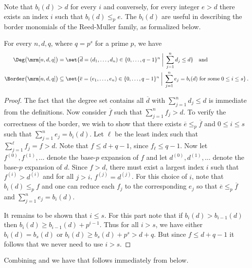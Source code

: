 Note that $b_i(d) > d$ for every $i$ and
conversely, for every integer $e > d$ there exists an index $i$ such
that $b_i(d) \leq_p e$.
%
The $b_i(d)$      %
are useful in describing
the border monomials of the Reed-Muller family, as formalized below.

\begin{proposition}
\label{prop:rmborder}
For every $n,d,q$, where $q=p^s$ for a prime $p$, we have
\begin{align*}
  \Deg\big(\mrm[n,d,q]\big) & =  \set{\overline d=(d_1,\ldots,d_n) \in \{0,\ldots,q-1\}^n \; \bigg| \; \sum_{j=1}^n d_j \leq d
} \quad\text{and}\\
\Border\big(\mrm[n,d,q]\big) & \subseteq 
\set{\overline e=(e_1,\ldots,e_n) \in \{0,\ldots,q-1\}^n \; \bigg| \;  \sum_{j=1}^n e_j = b_i(d) \; \text{for some} \; 0 \leq i \leq s   }\,.
\end{align*}
\end{proposition}

\begin{proof}
The fact that the degree set contains all ${\overline d}$
with $\sum_{j=1}^n d_j \leq d$ is immediate from the definitions.
Now consider ${\overline f}$ such that $\sum_{j=1}^n f_j > d$.
To verify the correctness of the border,
we wish to show that there exists ${\overline e} \leq_p
{\overline f}$ and $0 \leq i \leq s$ such that $\sum_{j=1}^n e_j =
b_i(d)$. Let $\ell$ be the least index such that $\sum_{j=1}^\ell
f_j = f > d$. Note that $f \leq d + q - 1$, since $f_\ell \leq
q - 1$. Now let $f^{(0)},f^{(1)},\ldots$ denote the
base-$p$ expansion of $f$ and let
$d^{(0)},d^{(1)},\ldots$ denote the base-$p$ expansion of $d$.
Since $f > d$, there must exist a largest index $i$ such that
$f^{(i)} > d^{(i)}$ and for all $j > i$, $f^{(j)} = d^{(j)}$.
For this choice of $i$, note that $b_i(d) \leq _p f$
and
one can reduce %
each $f_j$ to the corresponding $e_j$ %
so that
$\overline e \leq_p \overline f$ and $\sum_{j=1}^n e_j = b_i(d)$.

It remains to be shown that $i \leq s$. For this part
note that if $b_i(d) > b_{i-1}(d)$ then $b_i(d) \geq b_{i-1}(d) + p^{i-1}$.
Thus for all $i > s$, we have either $b_i(d) = b_s(d)$
or $b_i(d) \geq b_s(d) + p^s > d + q$. But since $f \leq d + q-1$
it follows that we never need to use $i > s$.
\end{proof}

Combining 
and 
we have that 
follows immediately from  below.

